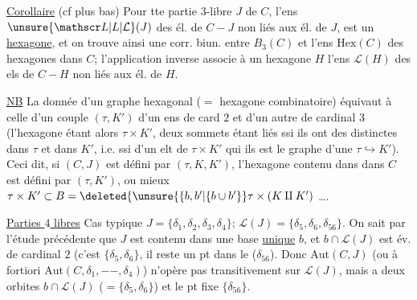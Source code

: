 \uline{Corollaire} (cf plus bas) Pour tte partie $3$-libre $J$ de $C$, l'ens $\unsure{\mathscr L|L|\mathcal L}(J)$ des él. de $C-J$ non liés aux él. de $J$, est un \uline{hexagone}, et on trouve ainsi une corr. biun. entre $B_3(C)$ et l'ens $\mathrm{Hex}(C)$ des hexagones dans $C$; l'application inverse associe à un hexagone $H$ l'ens $\mathscr L(H)$ des els de $C-H$ non liés aux él. de $H$.

\uline{NB} La donnée d'un graphe hexagonal ($=$ hexagone combinatoire) équivaut à celle d'un couple  $(\tau,K')$ d'un ens de card $2$ et d'un autre de cardinal $3$ (l'hexagone étant alors $\tau\times K'$, deux sommets étant liés ssi ils  ont des   distinctes dans $\tau$ et dans $K'$, i.e. ssi  d'un elt de $\tau\times K'$ qui ils  est le graphe d'une  $\tau\hookrightarrow K'$). Ceci dit, si $(C,J)$ est défini par $(\tau,K,K')$, l'hexagone contenu dans dans $C$ est défini par $(\tau,K')$, ou mieux $\tau\times K'\subset B=\deleted{\unsure{\{b,b'|\{b\cup b'}}\tau\times(K\amalg K')$ \ldots.

\uline{Parties $4$ libres} Cas typique $J=\{\delta_1,\delta_2,\delta_3,\delta_4\}$; $\mathscr L(J)=\{\delta_5,\delta_6,\delta_{56}\}$.  On sait par l'étude précédente que $J$ est contenu dans une base \uline{unique} $b$, et $b\cap \mathscr L(J)$ est év. de cardinal $2$ (c'est $\{\delta_5,\delta_6\}$, il reste un pt dans le  ($\delta_{56}$). Donc $\mathrm{Aut}(C,J)$ (ou à fortiori $\mathrm{Aut}(C,\delta_1,--,\delta_4)$) n'opère pas transitivement sur $\mathscr L(J)$, mais  a deux orbites $b\cap \mathscr L(J)$ ($=\{\delta_5,\delta_6\}$) et le pt fixe $\{\delta_{56}\}$.

